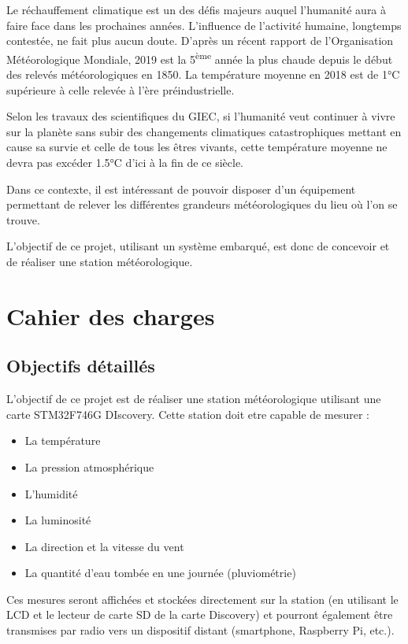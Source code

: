 \documentclass[12pt]{article}
\begin{document}
 







\tableofcontents
\label{toc} %


\listoffigures

\newpage


\clearpage
\setcounter{page}{3}

\pagestyle{fancy}

Le réchauffement climatique est un des défis majeurs auquel l'humanité aura à faire face dans les prochaines années. L'influence de l'activité humaine, longtemps contestée, ne fait plus aucun doute. D'après un récent rapport de l'Organisation Météorologique Mondiale, 2019 est la 5\textsuperscript{ème} année la plus chaude depuis le début des relevés météorologiques en 1850. La température moyenne en 2018 est de 1°C supérieure à celle relevée à l'ère préindustrielle.

Selon les travaux des scientifiques du GIEC, si l'humanité veut continuer à vivre sur la planète sans subir des changements climatiques catastrophiques mettant en cause sa survie et celle de tous les êtres vivants, cette température moyenne ne devra pas excéder 1.5°C d'ici à la fin de ce siècle.

Dans ce contexte, il est intéressant de pouvoir disposer d'un équipement permettant de relever les différentes grandeurs météorologiques du lieu où l'on se trouve.

L'objectif de ce projet, utilisant un système embarqué, est donc de concevoir et de réaliser une station météorologique.

\newpage

\section{Cahier des charges}
\subsection{Objectifs détaillés}
L'objectif de ce projet est de réaliser une station météorologique utilisant une carte STM32F746G DIscovery.
Cette station doit etre capable de mesurer : 
\begin{itemize}
    \item La température
    \item La pression atmosphérique
    \item L'humidité
    \item La luminosité
    \item La direction et la vitesse du vent
    \item La quantité d'eau tombée en une journée (pluviométrie)
\end{itemize}
Ces mesures seront affichées et stockées directement sur la station (en utilisant le LCD et le lecteur de carte SD de la carte Discovery) et pourront également être transmises par radio vers un dispositif distant (smartphone, Raspberry Pi, etc.).
\end{document}
